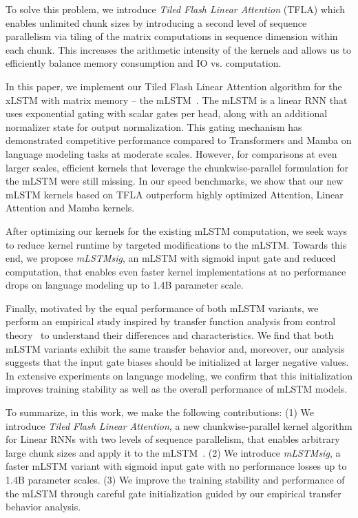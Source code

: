 \documentclass{article}
\begin{document}
To solve this problem, we introduce \emph{Tiled Flash Linear Attention} (TFLA) which enables unlimited chunk sizes by introducing a second level of sequence parallelism via tiling of the matrix computations in sequence dimension within each chunk.
This increases the arithmetic intensity of the kernels and allows us to efficiently balance memory consumption and IO vs. computation.

In this paper, we implement our Tiled Flash Linear Attention algorithm for the xLSTM with matrix memory -- the mLSTM~\cite{beck:24xlstm}.
The mLSTM is a linear RNN that uses exponential gating with scalar gates per head, along with an additional normalizer state for output normalization.
This gating mechanism has demonstrated competitive performance compared to Transformers and Mamba on language modeling tasks at moderate scales.
However, for comparisons at even larger scales, efficient kernels that leverage the chunkwise-parallel formulation for the mLSTM were still missing.
In our speed benchmarks, we show that our new mLSTM kernels based on TFLA outperform highly optimized Attention, Linear Attention and Mamba kernels.

After
optimizing
our kernels for the existing mLSTM computation, we seek ways to reduce kernel runtime by targeted modifications to the mLSTM.
Towards this end, we propose \emph{mLSTMsig}, an mLSTM with sigmoid input gate and reduced computation, that enables even faster kernel implementations at no performance drops on language modeling up to 1.4B parameter scale.

Finally, motivated by the equal performance of both mLSTM variants, we perform an empirical
study inspired by transfer function analysis from control theory~\citep{ogata:10bookcontrolengineering} to understand their differences and characteristics.
We find that both mLSTM variants exhibit the same transfer behavior and, moreover, our analysis suggests that the input gate biases should be initialized at larger negative values.
In
extensive
experiments on language modeling, we confirm that this initialization improves training stability as well as the overall performance of mLSTM models.

To summarize, in this work, we make the following contributions:
(1) We introduce \emph{Tiled Flash Linear Attention}, a new chunkwise-parallel kernel algorithm for Linear RNNs with two levels of sequence parallelism, that enables arbitrary large chunk sizes and apply it to the mLSTM~\citep{beck:24xlstm}.
(2) We introduce \emph{mLSTMsig}, a faster mLSTM variant with sigmoid input gate with no performance losses up to 1.4B parameter scales.
(3) We improve the training stability and performance of the mLSTM through careful gate initialization guided by our empirical transfer behavior analysis.
\end{document}
